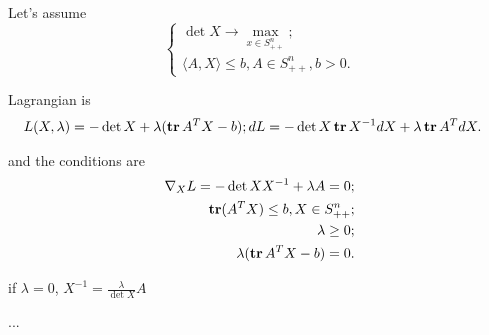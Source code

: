 \begin{eexl}
    Let's assume 
    \begin{equation*}
        \begin{cases}
            \det X \to \max_{x \in S_{++}^n}; \\ 
            \langle A, X \rangle \leq b, A \in S_{++}^{n}, b > 0.
        \end{cases}
    \end{equation*}

    Lagrangian is
    \begin{equation*}
        \begin{aligned}
            L(X, \lambda) &= -\det X + \lambda (\operatorname{\textbf{tr}} A^T X - b); 
            dL = -\det X \operatorname{\textbf{tr}} X^{-1} dX + \lambda \operatorname{\textbf{tr}} A^T dX.
        \end{aligned}
    \end{equation*}

    and the conditions are
    \begin{equation*}
        \begin{aligned}
            \nabla_X L = -\det X X^{-1} + \lambda A = 0; \\ 
            \operatorname{\textbf{tr}}( A^T X ) \leq b, X \in S_{++}^n; \\  
            \lambda \geq 0; \\ 
            \lambda (\operatorname{\textbf{tr}} A^T X - b) = 0.
        \end{aligned}
    \end{equation*}

    if $\lambda = 0$, $X^{-1} = \frac{\lambda}{\det X} A $ 

    \begin{center}
        \Huge{...}
    \end{center}
\end{eexl}

